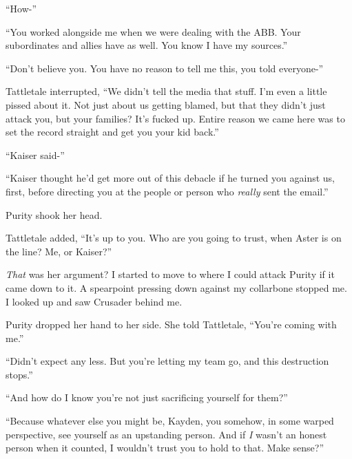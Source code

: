 ``How-''



``You worked alongside me when we were dealing with the ABB.  Your subordinates and allies have as well.  You know I have my sources.''



``Don't believe you.  You have no reason to tell me this, you told everyone-''



Tattletale interrupted, ``We didn't tell the media that stuff.  I'm even a little pissed about it.  Not just about us getting blamed, but that they didn't just attack you, but your families?  It's fucked up.  Entire reason we came here was to set the record straight and get you your kid back.''



``Kaiser said-''



``Kaiser thought he'd get more out of this debacle if he turned you against us, first, before directing you at the people or person who \emph{really} sent the email.''



Purity shook her head.



Tattletale added, ``It's up to you.  Who are you going to trust, when Aster is on the line?  Me, or Kaiser?''



\emph{That} was her argument?  I started to move to where I could attack Purity if it came down to it.  A spearpoint pressing down against my collarbone stopped me.  I looked up and saw Crusader behind me.



Purity dropped her hand to her side.  She told Tattletale, ``You're coming with me.''



``Didn't expect any less.  But you're letting my team go, and this destruction stops.''



``And how do I know you're not just sacrificing yourself for them?''



``Because whatever else you might be, Kayden, you somehow, in some warped perspective, see yourself as an upstanding person.  And if \emph{I }wasn't an honest person when it counted, I wouldn't trust you to hold to that.  Make sense?''



